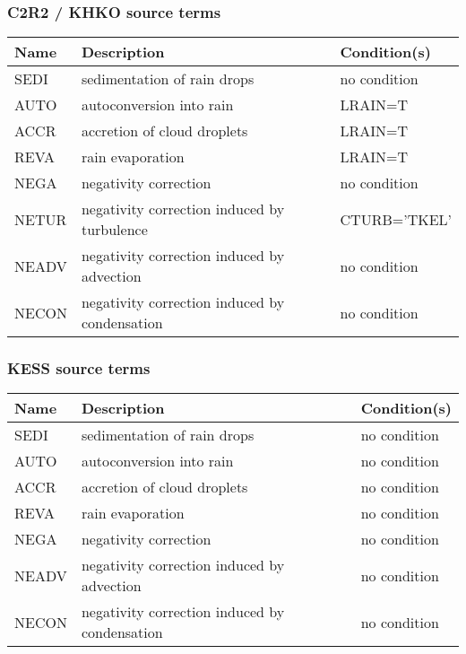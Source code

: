 \subsubsection{C2R2 / KHKO source terms}

\begin{longtable} {|p{}|p{}|p{}|}
\hline
Name & Description & Condition(s) \\
\hline \hline
\endhead
SEDI   & sedimentation of rain drops                   & no condition \\\hline
AUTO   & autoconversion into rain                      & LRAIN=T \\\hline
ACCR   & accretion of cloud droplets                   & LRAIN=T \\\hline
REVA   & rain evaporation                              & LRAIN=T \\\hline
NEGA   & negativity correction                         & no condition \\\hline
NETUR  & negativity correction induced by turbulence   & CTURB='TKEL' \\\hline
NEADV  & negativity correction induced by advection    & no condition \\\hline
NECON  & negativity correction induced by condensation & no condition \\\hline
\end{longtable}

\subsubsection{KESS source terms}

\begin{longtable} {|p{}|p{}|p{}|}
\hline
Name & Description & Condition(s) \\
\hline \hline
\endhead
SEDI   & sedimentation of rain drops                   & no condition \\\hline
AUTO   & autoconversion into rain                      & no condition \\\hline
ACCR   & accretion of cloud droplets                   & no condition \\\hline
REVA   & rain evaporation                              & no condition \\\hline
NEGA   & negativity correction                         & no condition \\\hline
NEADV  & negativity correction induced by advection    & no condition \\\hline
NECON  & negativity correction induced by condensation & no condition \\\hline
\end{longtable}


